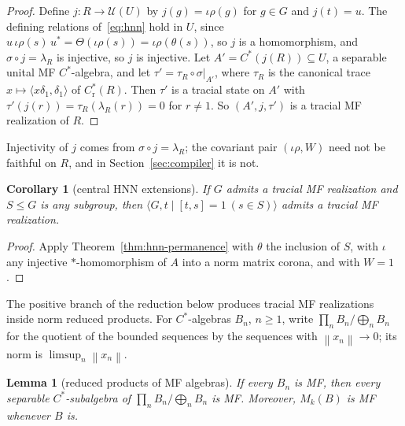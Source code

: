 \documentclass[11pt]{amsart}
\newcommand{\leanverified}[2]{\ignorespaces}
\newtheorem{lemma}[theorem]{Lemma}
\newtheorem{corollary}[theorem]{Corollary}
\theoremstyle{remark}
\theoremstyle{plain}
\newcommand{\U}{\mathcal U}
\newcommand{\opnorm}[1]{\left\lVert #1\right\rVert}
\begin{document}
\begin{proof}
Define $j\colon R\to\U(U)$ by $j(g)=\iota\rho(g)$ for $g\in G$ and
$j(t)=u$.  The defining relations of~\eqref{eq:hnn} hold in $U$, since
$u\,\iota\rho(s)\,u^*=\Theta(\iota\rho(s))=\iota\rho(\theta(s))$, so $j$
is a homomorphism, and $\sigma\circ j=\lambda_R$ is injective, so $j$ is
injective.  Let $A'=C^*(j(R))\subseteq U$, a separable unital MF
\leanverified{Manuscript/OneSidedMFRadical/HNNCoronaConjugatorSentenceAudit}{GroupApproximation.Manuscript.OneSidedMFRadical.HNNCoronaConjugatorSentenceAudit.universalCStarHNN_groupLift_injective}
$C^*$-algebra, and let $\tau'=\tau_R\circ\sigma|_{A'}$, where $\tau_R$ is
the canonical trace $x\mapsto\langle x\delta_1,\delta_1\rangle$ of
$C^*_{\mathrm r}(R)$.  Then $\tau'$ is a tracial state on $A'$ with
$\tau'(j(r))=\tau_R(\lambda_R(r))=0$ for $r\ne1$.  So $(A',j,\tau')$
is a tracial MF realization of $R$.
\end{proof}

Injectivity of $j$ comes from $\sigma\circ j=\lambda_R$; the covariant pair
$(\iota\rho,W)$ need not be faithful on $R$, and in
Section~\ref{sec:compiler} it is not.

\begin{corollary}[central HNN extensions]\label{cor:central-hnn}
If $G$ admits a tracial MF realization and $S\le G$ is any subgroup, then
$\langle G,t\mid[t,s]=1\ (s\in S)\rangle$ admits a tracial MF realization.
\end{corollary}

\begin{proof}
Apply Theorem~\ref{thm:hnn-permanence} with $\theta$ the inclusion of
$S$, with $\iota$ any injective $*$-homomorphism of $A$ into a norm matrix
corona, and with $W=1$.
\end{proof}

The positive branch of the reduction below produces tracial MF
realizations inside norm reduced products.  For $C^*$-algebras $B_n$,
$n\ge1$, write $\prod_nB_n/\bigoplus_nB_n$ for the quotient of the bounded
sequences by the sequences with $\opnorm{x_n}\to0$; its norm is
$\limsup_n\opnorm{x_n}$.

\begin{lemma}[reduced products of MF algebras]\label{lem:reduced-products}
If every $B_n$ is MF, then every separable $C^*$-subalgebra of
$\prod_nB_n/\bigoplus_nB_n$ is MF\@.  Moreover, $M_k(B)$ is MF whenever
$B$ is.
\leanverified{Manuscript/MFRecognition/ReducedProductsPermanenceWiring}{GroupApproximation.Manuscript.MFRecognition.TensorSynchronization.reducedProduct_separableSubalgebra_isMF}
\leanverified{Analysis/MFAlgebraMatrixAmplification}{GroupApproximation.MFAlgebraMatrixAmplification.isMFAlgebra_cstarMatrix}
\end{lemma}
\end{document}
